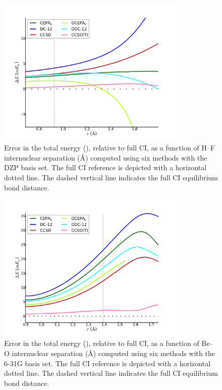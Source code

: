 \begin{figure}
	\centering
	\caption{%
        \label{hf-f}
        Error in the total energy (\mhartree), relative to full CI, as a
        function of H--F internuclear separation (\AA) computed using six
        methods with the DZP basis set.
        The full CI reference is depicted with a horizontal dotted line.
        The dashed vertical line indicates the full CI equilibrium bond
        distance.
	}
	\includegraphics[width=0.8\textwidth]{figures/hf.pdf}
\end{figure}

\begin{figure}
	\centering
	\caption{%
        \label{beo-f}
        Error in the total energy (\mhartree), relative to full CI, as a
        function of Be--O internuclear separation (\AA) computed using six
        methods with the 6-31G basis set.
        The full CI reference is depicted with a horizontal dotted line.
        The dashed vertical line indicates the full CI equilibrium bond
        distance.
	}
	\includegraphics[width=0.8\textwidth]{figures/beo.pdf}
\end{figure}

